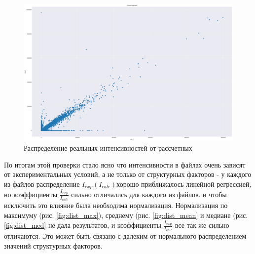 \documentclass{article}
\begin{document}
\begin{figure}[h!]
\includegraphics[width=\linewidth]{imgs/dist.png}
  \caption{Распределение реальных интенсивностей от рассчетных}\label{img:dist}
\end{figure}


 По итогам этой проверки стало ясно что интенсивности в файлах очень зависят от экспериментальных условий, а не только от структурных факторов - у каждого из файлов распределение $I_{exp}(I_{calc})$хорошо приближалось линейной регрессией, но коэффициенты $\frac{I_{exp}}{I_{calc}}$ сильно отличались для каждого из файлов. и чтобы исключить это влияние была необходима нормализация. Нормализация по максимуму (рис. \ref{fig:dist_max}), среднему (рис. \ref{fig:dist_mean} и медиане (рис. \ref{fig:dist_med} не дала результатов, и коэффициенты $\frac{I_{exp}}{I_{calc}}$ все так же сильно отличаются. Это может быть связано с далеким от нормального распределением значений структурных факторов.
\end{document}
